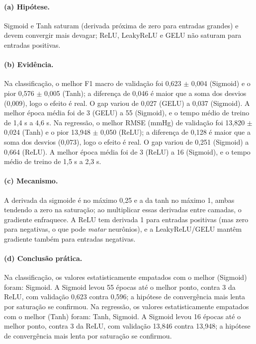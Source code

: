 \documentclass[11pt,a4paper]{article}
\begin{document}
\paragraph{(a) Hipótese.} Sigmoid e Tanh saturam (derivada próxima de zero para entradas grandes) e devem convergir mais devagar; ReLU, LeakyReLU e GELU não saturam para entradas positivas.

\paragraph{(b) Evidência.} Na classificação, o melhor F1 macro de validação foi 0,623 $\pm$ 0,004 (Sigmoid) e o pior 0,576 $\pm$ 0,005 (Tanh); a diferença de 0,046 é maior que a soma dos desvios (0,009), logo o efeito é real. O gap variou de 0,027 (GELU) a 0,037 (Sigmoid). A melhor época média foi de 3 (GELU) a 55 (Sigmoid), e o tempo médio de treino de 1,4 s a 4,6 s. Na regressão, o melhor RMSE (mmHg) de validação foi 13,820 $\pm$ 0,024 (Tanh) e o pior 13,948 $\pm$ 0,050 (ReLU); a diferença de 0,128 é maior que a soma dos desvios (0,073), logo o efeito é real. O gap variou de 0,251 (Sigmoid) a 0,664 (ReLU). A melhor época média foi de 3 (ReLU) a 16 (Sigmoid), e o tempo médio de treino de 1,5 s a 2,3 s.

\paragraph{(c) Mecanismo.} A derivada da sigmoide é no máximo 0,25 e a da tanh no máximo 1, ambas tendendo a zero na saturação; ao multiplicar essas derivadas entre camadas, o gradiente enfraquece. A ReLU tem derivada 1 para entradas positivas (mas zero para negativas, o que pode \emph{matar} neurônios), e a LeakyReLU/GELU mantêm gradiente também para entradas negativas.

\paragraph{(d) Conclusão prática.} Na classificação, os valores estatisticamente empatados com o melhor (Sigmoid) foram: Sigmoid. A Sigmoid levou 55 épocas até o melhor ponto, contra 3 da ReLU, com validação 0,623 contra 0,596; a hipótese de convergência mais lenta por saturação se confirmou. Na regressão, os valores estatisticamente empatados com o melhor (Tanh) foram: Tanh, Sigmoid. A Sigmoid levou 16 épocas até o melhor ponto, contra 3 da ReLU, com validação 13,846 contra 13,948; a hipótese de convergência mais lenta por saturação se confirmou.
\end{document}
